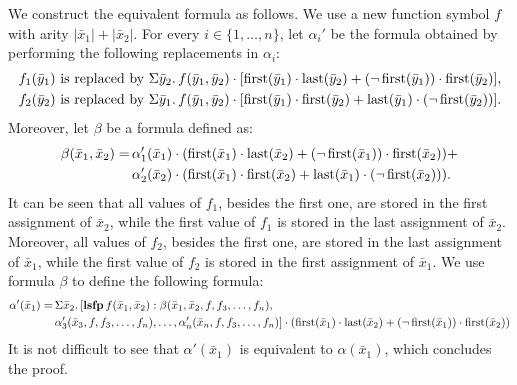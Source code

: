 We construct the equivalent formula as follows. We use a new function symbol $f$ with arity $|\bar{x}_1| + |\bar{x}_2|$. For every $i \in \{1,\ldots,n\}$, let $\alpha_i'$ be the formula obtained by performing the following replacements in $\alpha_i$: 
\begin{align*}
f_1(\bar{y}_1) &\text{ is replaced by } \Sigma{\bar{y}_2}.\,f(\bar{y}_1,\bar{y}_2)\cdot[\operatorname{first}(\bar{y}_1)\cdot\operatorname{last}(\bar{y}_2)  + (\neg\operatorname{first}(\bar{y}_1))\cdot\operatorname{first}(\bar{y}_2)], \\
f_2(\bar{y}_2) &\text{ is replaced by } \Sigma{\bar{y}_1}.\,f(\bar{y}_1,\bar{y}_2)\cdot[\operatorname{first}(\bar{y}_1)\cdot\operatorname{first}(\bar{y}_2)  + \operatorname{last}(\bar{y}_1)\cdot(\neg\operatorname{first}(\bar{y}_2))].
\end{align*}
Moreover, let $\beta$ be a formula defined as:
\begin{align*}
\beta(\bar{x}_1,\bar{x}_2) = \,&\alpha_1'(\bar{x}_1)\cdot(\operatorname{first}(\bar{x}_1)\cdot\operatorname{last}(\bar{x}_2)  + (\neg\operatorname{first}(\bar{x}_1))\cdot\operatorname{first}(\bar{x}_2)) + \\ &\alpha_2'(\bar{x}_2)\cdot(\operatorname{first}(\bar{x}_1)\cdot\operatorname{first}(\bar{x}_2)  + \operatorname{last}(\bar{x}_1)\cdot(\neg\operatorname{first}(\bar{x}_2))).
\end{align*}
It can be seen that all values of $f_1$, besides the first one, are stored in the first assignment of $\bar{x}_2$, while the first value of $f_1$ is stored in the last assignment of $\bar{x}_2$. Moreover, all values of $f_2$, besides the first one, are stored in the last assignment of $\bar{x}_1$, while the first value of $f_2$ is stored in the first assignment of $\bar{x}_1$. 
We use formula $\beta$ to define the following formula:
\begin{align*}
\alpha'(\bar{x}_1) = \,&\Sigma{\bar{x}_2}.\,[{\bf lsfp} \, f(\bar{x}_1,\bar{x}_2): \beta(\bar{x}_1,\bar{x}_2,f,f_3,\ldots,f_n),\\
&\alpha'_3(\bar{x}_3,f,f_3,\ldots,f_n),\ldots,\alpha'_n(\bar{x}_n,f,f_3,\ldots,f_n)]\cdot(\operatorname{first}(\bar{x}_1)\cdot\operatorname{last}(\bar{x}_2)  + (\neg\operatorname{first}(\bar{x}_1))\cdot\operatorname{first}(\bar{x}_2))
\end{align*}
It is not difficult to see that $\alpha'(\bar{x}_1)$ is equivalent to $\alpha(\bar{x}_1)$, which concludes the proof.

